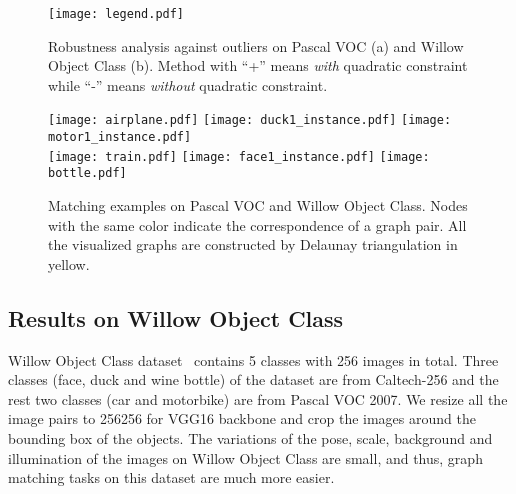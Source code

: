 \documentclass[final]{cvpr}
\begin{document}
\begin{figure}[t!]
\vspace{-7mm}
\centering
\texttt{[image: legend.pdf]}\\
\vspace{-1mm}
\caption{Robustness analysis against outliers on Pascal VOC (a) and Willow Object Class (b). Method with ``+'' means {\em with} quadratic constraint while ``-'' means {\em without} quadratic constraint.}
\label{fig:comparison}
\vspace{-3mm}
\end{figure}

\begin{figure*}[t!]
\centering
\texttt{[image: airplane.pdf]}
\texttt{[image: duck1\_instance.pdf]}
\texttt{[image: motor1\_instance.pdf]}\\
\texttt{[image: train.pdf]}
\texttt{[image: face1\_instance.pdf]}
\texttt{[image: bottle.pdf]}
\caption{Matching examples on Pascal VOC and Willow Object Class. Nodes with the same color indicate the correspondence of a graph pair. All the visualized graphs are constructed by Delaunay triangulation in yellow.}
\vspace{-3mm}
\label{fig:example}
\end{figure*}

\subsection{Results on Willow Object Class}
Willow Object Class dataset~\cite{cho2013learning} contains 5 classes with 256 images in total. Three classes (face, duck and wine bottle) of the dataset are from Caltech-256 and the rest two classes (car and motorbike) are from Pascal VOC 2007. We resize all the image pairs to 256256 for VGG16 backbone and crop the images around the bounding box of the objects. The variations of the pose, scale, background and illumination of the images on Willow Object Class are small, and thus, graph matching tasks on this dataset are much more easier.
\end{document}
